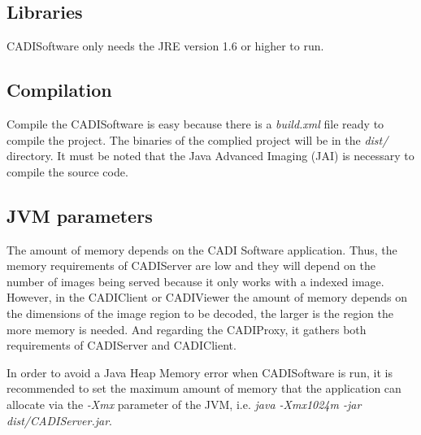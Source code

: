 \documentclass[a4paper,10pt]{article}
\begin{document}
\subsection*{Libraries}
\label{ssect:annex_libraries}

CADISoftware only needs the JRE version 1.6 or higher to run.


\subsection*{Compilation}
\label{ssect:annex_compilation}

Compile the CADISoftware is easy because there is a \emph{build.xml} file ready to compile the project. The binaries of the complied project will be in the \emph{dist/} directory. It must be noted that the Java Advanced Imaging (JAI) is necessary to compile the source code.


\subsection*{JVM parameters}
\label{ssect:annex_jvm}

The amount of memory depends on the CADI Software application. Thus, the memory requirements of CADIServer are low and they will depend on the number of images being served because it only works with a indexed image. However, in the CADIClient or CADIViewer the amount of memory depends on the dimensions of the image region to be decoded, the larger is the region the more memory is needed. And regarding the CADIProxy, it gathers both requirements of CADIServer and CADIClient.

In order to avoid a Java Heap Memory error when CADISoftware is run, it is recommended to set the maximum amount of memory that the application can allocate via the \emph{-Xmx} parameter of the JVM, i.e. \emph{java -Xmx1024m -jar dist/CADIServer.jar}.
\end{document}
